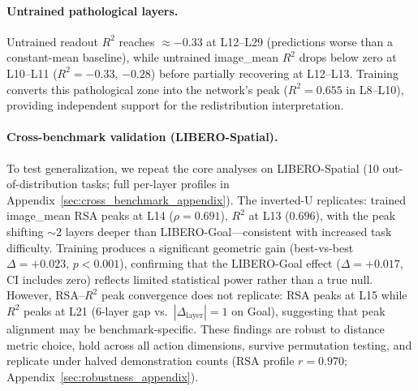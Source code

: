 \paragraph{Untrained pathological layers.}
Untrained readout $R^2$ reaches $\approx -0.33$ at L12--L29 (predictions worse than a constant-mean baseline), while untrained image\_mean $R^2$ drops below zero at L10--L11 ($R^2 = -0.33$, $-0.28$) before partially recovering at L12--L13.
Training converts this pathological zone into the network's peak ($R^2 = 0.655$ in L8--L10), providing independent support for the redistribution interpretation.

\paragraph{Cross-benchmark validation (LIBERO-Spatial).}
\label{sec:cross_benchmark}
To test generalization, we repeat the core analyses on LIBERO-Spatial (10 out-of-distribution tasks; full per-layer profiles in Appendix~\ref{sec:cross_benchmark_appendix}).
The inverted-U replicates: trained image\_mean RSA peaks at L14 ($\rho = 0.691$), $R^2$ at L13 ($0.696$), with the peak shifting ${\sim}2$ layers deeper than LIBERO-Goal---consistent with increased task difficulty.
Training produces a significant geometric gain (best-vs-best $\Delta = +0.023$, $p < 0.001$), confirming that the LIBERO-Goal effect ($\Delta = +0.017$, CI includes zero) reflects limited statistical power rather than a true null.
However, RSA--$R^2$ peak convergence does not replicate: RSA peaks at L15 while $R^2$ peaks at L21 (6-layer gap vs.\ $|\Delta_\text{layer}| = 1$ on Goal), suggesting that peak alignment may be benchmark-specific.
These findings are robust to distance metric choice, hold across all action dimensions, survive permutation testing, and replicate under halved demonstration counts (RSA profile $r = 0.970$; Appendix~\ref{sec:robustness_appendix}).

